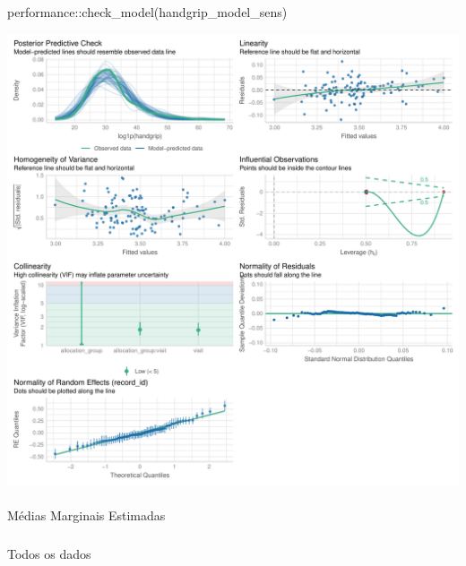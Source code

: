 \documentclass[
  12pt,
]{article}
\makeatletter
\let\oldparagraph\paragraph
\renewcommand{\paragraph}{
    \@ifstar
      \xxxParagraphStar
      \xxxParagraphNoStar
  }
\newcommand{\xxxParagraphStar}[1]{\oldparagraph*{#1}\mbox{}}
\newcommand{\xxxParagraphNoStar}[1]{\oldparagraph{#1}\mbox{}}
\let\oldsubparagraph\subparagraph
\renewcommand{\subparagraph}{
    \@ifstar
      \xxxSubParagraphStar
      \xxxSubParagraphNoStar
  }
\newcommand{\xxxSubParagraphStar}[1]{\oldsubparagraph*{#1}\mbox{}}
\newcommand{\xxxSubParagraphNoStar}[1]{\oldsubparagraph{#1}\mbox{}}
\newenvironment{Shaded}{\begin{snugshade}}{\end{snugshade}}
\newcommand{\FunctionTok}[1]{\textcolor[rgb]{0.28,0.35,0.67}{#1}}
\newcommand{\NormalTok}[1]{\textcolor[rgb]{0.00,0.23,0.31}{#1}}
\newcommand{\SpecialCharTok}[1]{\textcolor[rgb]{0.37,0.37,0.37}{#1}}
\makeatother
\begin{document}
\begin{Shaded}
\begin{Highlighting}[]
\NormalTok{performance}\SpecialCharTok{::}\FunctionTok{check\_model}\NormalTok{(handgrip\_model\_sens)}
\end{Highlighting}
\end{Shaded}

\includegraphics{Outcomes_files/figure-pdf/handgrip_4-2.pdf}

\paragraph{Médias Marginais
Estimadas}\label{muxe9dias-marginais-estimadas-20}

\subparagraph{Todos os dados}\label{todos-os-dados-20}
\end{document}
